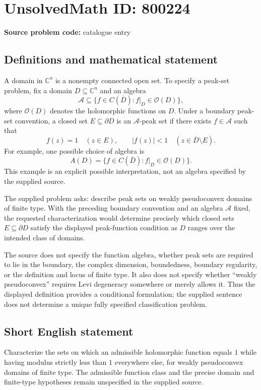 \documentclass[11pt]{article}
\newcommand{\C}{\mathbb{C}}
\begin{document}
\section*{UnsolvedMath ID: 800224}
\textbf{Source problem code:} catalogue entry
\subsection{Definitions and mathematical statement}
A domain in \(\C^n\) is a nonempty connected open set. To specify a peak-set problem, fix a domain \(D\subseteq\C^n\) and an algebra
\[
\mathcal A\subseteq\{f\in C(\overline D): f|_D\in\mathcal O(D)\},
\]
where \(\mathcal O(D)\) denotes the holomorphic functions on \(D\). Under a boundary peak-set convention, a closed set \(E\subseteq\partial D\) is an \(\mathcal A\)-peak set if there exists \(f\in\mathcal A\) such that
\[
f(z)=1\quad(z\in E),\qquad |f(z)|<1\quad(z\in\overline D\setminus E).
\]
For example, one possible choice of algebra is
\[
A(D)=\{f\in C(\overline D):f|_D\in\mathcal O(D)\}.
\]
This example is an explicit possible interpretation, not an algebra specified by the supplied source.

The supplied problem asks: describe peak sets on weakly pseudoconvex domains of finite type. With the preceding boundary convention and an algebra \(\mathcal A\) fixed, the requested characterization would determine precisely which closed sets \(E\subseteq\partial D\) satisfy the displayed peak-function condition as \(D\) ranges over the intended class of domains.

The source does not specify the function algebra, whether peak sets are required to lie in the boundary, the complex dimension, boundedness, boundary regularity, or the definition and locus of finite type. It also does not specify whether ``weakly pseudoconvex'' requires Levi degeneracy somewhere or merely allows it. Thus the displayed definition provides a conditional formulation; the supplied sentence does not determine a unique fully specified classification problem.
\subsection{Short English statement}
Characterize the sets on which an admissible holomorphic function equals \(1\) while having modulus strictly less than \(1\) everywhere else, for weakly pseudoconvex domains of finite type. The admissible function class and the precise domain and finite-type hypotheses remain unspecified in the supplied source.
\end{document}
